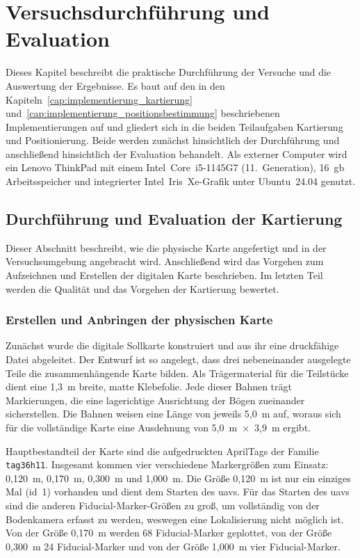 
\chapter{Versuchsdurchführung und Evaluation}
\label{cap:versuchsdurchführung}
Dieses Kapitel beschreibt die praktische Durchführung der Versuche und die Auswertung der Ergebnisse.
Es baut auf den in den Kapiteln~\ref{cap:implementierung_kartierung} und~\ref{cap:implementierung_positionsbestimmung} beschriebenen Implementierungen auf und gliedert sich in die beiden Teilaufgaben Kartierung und Positionierung.
Beide werden zunächst hinsichtlich der Durchführung und anschließend hinsichtlich der Evaluation behandelt.
Als externer Computer wird ein Lenovo ThinkPad mit einem Intel~Core~i5-1145G7 (11.~Generation), 16~\gls{gb} 
Arbeitsspeicher und integrierter Intel~Iris~Xe-Grafik unter Ubuntu~24.04 genutzt.




\section{Durchführung und Evaluation der Kartierung}
\label{sec:durchfuehrung_kartierung}
Dieser Abschnitt beschreibt, wie die physische Karte angefertigt und in der Versuchsumgebung angebracht wird.
Anschließend wird das Vorgehen zum Aufzeichnen und Erstellen der digitalen Karte beschrieben.
Im letzten Teil werden die Qualität und das Vorgehen der Kartierung bewertet.

\subsection{Erstellen und Anbringen der physischen Karte}
\label{sec:anbringen_karte}
Zunächst wurde die digitale Sollkarte konstruiert und aus ihr eine druckfähige Datei abgeleitet.
Der Entwurf ist so angelegt, dass drei nebeneinander ausgelegte Teile die zusammenhängende Karte bilden.
Als Trägermaterial für die Teilstücke dient eine 1,3~m breite, matte Klebefolie.
Jede dieser Bahnen trägt Markierungen, die eine lagerichtige Ausrichtung der Bögen zueinander sicherstellen.
Die Bahnen weisen eine Länge von jeweils 5,0~m auf, woraus sich für die vollständige Karte eine Ausdehnung von 5,0~m~$\times$~3,9~m ergibt.

Hauptbestandteil der Karte sind die aufgedruckten AprilTags der Familie \texttt{tag36h11}.
Insgesamt kommen vier verschiedene Markergrößen zum Einsatz: 0,120~m, 0,170~m, 0,300~m und 1,000~m.
Die Größe 0,120~m ist nur ein einziges Mal (\gls{id}~1) vorhanden und dient dem Starten des \gls{uav}s.
Für das Starten des \gls{uav}s sind die anderen Fiducial-Marker-Größen zu groß, um vollständig von der Bodenkamera erfasst zu werden, weswegen eine Lokalisierung nicht möglich ist.
Von der Größe 0,170~m werden 68 Fiducial-Marker geplottet, von der Größe 0,300~m 24 Fiducial-Marker und von der Größe 1,000~m vier Fiducial-Marker.

